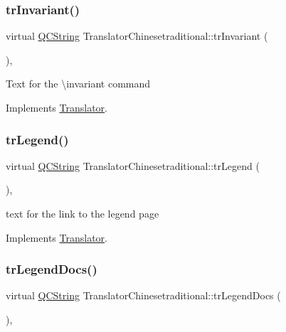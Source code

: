 \subsubsection{\texorpdfstring{trInvariant()}{trInvariant()}}
{\footnotesize\ttfamily virtual \mbox{\hyperlink{class_q_c_string}{Q\+C\+String}} Translator\+Chinesetraditional\+::tr\+Invariant (\begin{DoxyParamCaption}{ }\end{DoxyParamCaption})\hspace{0.3cm}{\ttfamily [inline]}, {\ttfamily [virtual]}}

Text for the \textbackslash{}invariant command 

Implements \mbox{\hyperlink{class_translator}{Translator}}.

\mbox{\label{class_translator_chinesetraditional_a7ec3338207371dd6b06edfe7a212d443}} 
\subsubsection{\texorpdfstring{trLegend()}{trLegend()}}
{\footnotesize\ttfamily virtual \mbox{\hyperlink{class_q_c_string}{Q\+C\+String}} Translator\+Chinesetraditional\+::tr\+Legend (\begin{DoxyParamCaption}{ }\end{DoxyParamCaption})\hspace{0.3cm}{\ttfamily [inline]}, {\ttfamily [virtual]}}

text for the link to the legend page 

Implements \mbox{\hyperlink{class_translator}{Translator}}.

\mbox{\label{class_translator_chinesetraditional_a6813a103a994d36bf508b0b8b03995e7}} 
\subsubsection{\texorpdfstring{trLegendDocs()}{trLegendDocs()}}
{\footnotesize\ttfamily virtual \mbox{\hyperlink{class_q_c_string}{Q\+C\+String}} Translator\+Chinesetraditional\+::tr\+Legend\+Docs (\begin{DoxyParamCaption}{ }\end{DoxyParamCaption})\hspace{0.3cm}{\ttfamily [inline]}, {\ttfamily [virtual]}}

